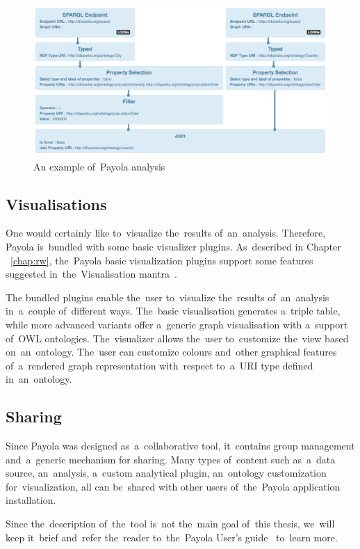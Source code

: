 \begin{figure}
	\centering
	\includegraphics[width=150mm]{images/example-analysis.png}
	\caption{An example of~Payola analysis}
	\label{fig:example-analysis}
\end{figure}

\subsection{Visualisations}
One would certainly like to~visualize the~results of~an~analysis. Therefore, 
Payola is~bundled with some basic visualizer plugins. As~described
in Chapter ~\ref{chap:rw}, the~Payola basic visualization 
plugins support some features suggested in~the~Visualisation 
mantra~\cite{mantra}.

The bundled plugins enable the~user to~visualize the~results of~an~analysis 
in~a~couple of~different ways. The~basic visualisation generates a~triple 
table, while more advanced variants offer a~generic graph visualisation with a~support of~OWL ontologies.
The~visualizer allows the~user to~customize the~view based on~an~ontology.
The~user can customize colours and~other graphical 
features of~a~rendered graph representation with~respect to~a~URI type defined in~an~ontology.

\subsection{Sharing}
Since Payola was designed as~a~collaborative tool, it~contains group 
management and~a~generic mechanism for sharing. Many types of~content such as~a~data source, an~analysis, a~custom analytical plugin, an~ontology customization
for~visualization, all can be~shared with other users of~the~Payola application 
installation.

Since the~description of~the~tool is~not the~main goal of~this thesis, we~will 
keep it~brief and~refer the~reader to~the~Payola User's guide~\cite{payola:ug} to~learn more.

